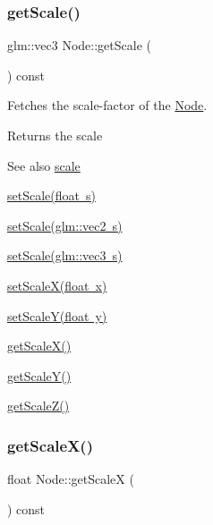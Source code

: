 \subsubsection{\texorpdfstring{getScale()}{getScale()}}
{\footnotesize\ttfamily glm\+::vec3 Node\+::get\+Scale (\begin{DoxyParamCaption}{ }\end{DoxyParamCaption}) const}



Fetches the scale-\/factor of the \mbox{\hyperlink{classsage_1_1Node}{Node}}. 

\begin{DoxyReturn}{Returns}
the scale 
\end{DoxyReturn}
\begin{DoxySeeAlso}{See also}
\mbox{\hyperlink{classsage_1_1Node_a686c3edeea1faab8b566bfdf2fe3f906}{scale}} 

\mbox{\hyperlink{classsage_1_1Node_a939698b2eb68ee5b60b91e2426e95369}{set\+Scale(float s)}} 

\mbox{\hyperlink{classsage_1_1Node_aecff30b003ce1c2266cc60a34b72559d}{set\+Scale(glm\+::vec2 s)}} 

\mbox{\hyperlink{classsage_1_1Node_a7481b934a6ef259a14aee4d0b87cb2aa}{set\+Scale(glm\+::vec3 s)}} 

\mbox{\hyperlink{classsage_1_1Node_ab8126397f90ccdee0755b984b26809d8}{set\+Scale\+X(float x)}} 

\mbox{\hyperlink{classsage_1_1Node_afa22161545d63e9e011f8eeb5acdead7}{set\+Scale\+Y(float y)}} 

\mbox{\hyperlink{classsage_1_1Node_a27040ef8ab59ccf42b87d6ddc8d794e6}{get\+Scale\+X()}} 

\mbox{\hyperlink{classsage_1_1Node_ab87661ab8940512baf2e7639ea55ff87}{get\+Scale\+Y()}} 

\mbox{\hyperlink{classsage_1_1Node_a0b55ddbe04d126953e1db8606d9a9ecd}{get\+Scale\+Z()}} 
\end{DoxySeeAlso}
\mbox{\label{classsage_1_1Node_a27040ef8ab59ccf42b87d6ddc8d794e6}} 
\subsubsection{\texorpdfstring{getScaleX()}{getScaleX()}}
{\footnotesize\ttfamily float Node\+::get\+ScaleX (\begin{DoxyParamCaption}{ }\end{DoxyParamCaption}) const}



